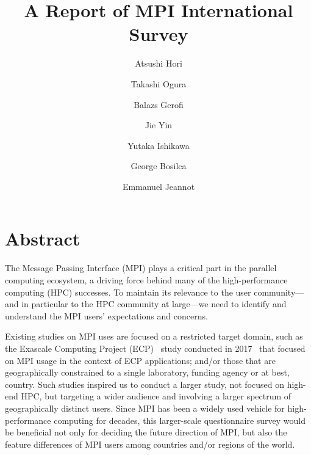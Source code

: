 \documentclass[sigconf,nonacm]{acmart}
\begin{document}
\title{A Report of MPI International Survey}

\author{Atsushi Hori}
\author{Takashi Ogura}
\author{Balazs Gerofi}
\author{Jie Yin}
\author{Yutaka Ishikawa}

\author{George Bosilca}

\author{Emmanuel Jeannot}

\maketitle

\section{Abstract}

The Message Passing Interface (MPI) plays a critical part in the
parallel computing 
ecosystem, a driving force behind many of the high-performance
computing (HPC) successes. To maintain its relevance to the user
community---and in particular to the HPC community at large---we need
to identify and understand the MPI users' expectations and concerns. 

%
Existing studies on MPI uses are focused on a restricted target domain,
such as the Exascale Computing Project (ECP)~\cite{ECP} study
conducted in 2017~\cite{osti_1462877} that focused 
on MPI usage in the context of ECP applications; and/or those that are
geographically 
constrained to a single laboratory, funding agency or at best, country.
%
Such studies inspired us to conduct a larger study, not focused on
high-end HPC, but
targeting a wider audience and involving a larger spectrum of geographically
distinct users. Since MPI has been a widely used vehicle for high-performance
computing for decades, this larger-scale questionnaire survey would be
beneficial not only for deciding the future direction of MPI, but also the
feature differences of MPI users among countries and/or regions of the world.
\end{document}

